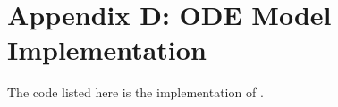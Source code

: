 \chapter{Appendix D: ODE Model Implementation}
\label{AppendixD}

The code listed here is the implementation of . 

\begin{algorithm}
    
\end{algorithm}